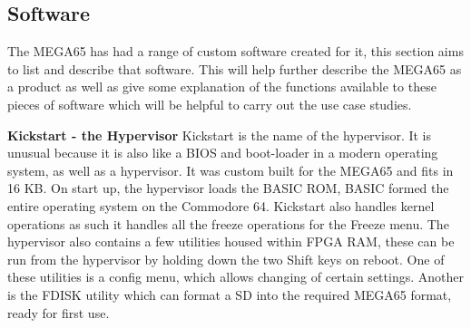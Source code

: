 \subsection{Software}
The MEGA65 has had a range of custom software created for it, this section aims to list and describe that software. This will help further describe the MEGA65 as a product as well as give some explanation of the functions available to these pieces of software which will be helpful to carry out the use case studies.

\textbf{Kickstart - the Hypervisor}
Kickstart is the name of the hypervisor. It is unusual because it is also like a BIOS and boot-loader in a modern operating system, as well as a hypervisor. It was custom built for the MEGA65 and fits in 16 KB. On start up, the hypervisor loads the BASIC ROM, BASIC formed the entire operating system on the Commodore 64. Kickstart also handles kernel operations as such it handles all the freeze operations for the Freeze menu. The hypervisor also contains a few utilities housed within FPGA RAM, these can be run from the hypervisor by holding down the two Shift keys on reboot. One of these utilities is a config menu, which allows changing of certain settings. Another is the FDISK utility which can format a SD into the required MEGA65 format, ready for first use.

